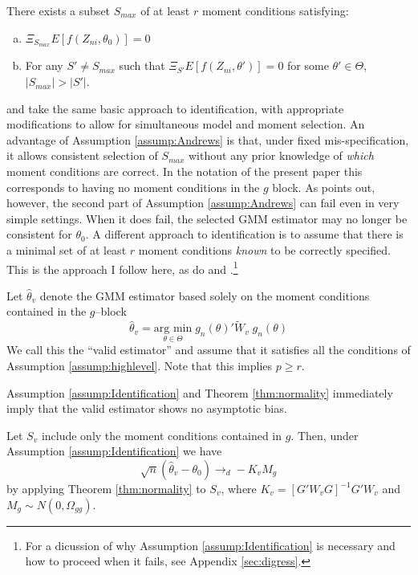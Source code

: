 \begin{assump}
	\label{assump:Andrews}
There exists a subset $S_{max}$ of at least $r$ moment conditions satisfying:
	\begin{enumerate}[(a)]
	 	\item $\Xi_{S_{max}} E[f(Z_{ni},\theta_0)]= 0$
	 	\item For any $S' \neq S_{max}$ such that $\Xi_{S'} E[f(Z_{ni},\theta')]= 0$ for some $\theta' \in \Theta$, $|S_{max}| > |S'|$.
	 \end{enumerate}
\end{assump}

\cite{AndrewsLu} and \cite{HongPrestonShum} take the same basic approach to identification, with appropriate modifications to allow for simultaneous model and moment selection. 
An advantage of Assumption \ref{assump:Andrews} is that, under fixed mis-specification, it allows consistent selection of $S_{max}$ without any prior knowledge of \emph{which} moment conditions are correct. 
In the notation of the present paper this corresponds to having no moment conditions in the $g$ block. As \citet[p.\ 254]{Hallbook} points out, however, the second part of Assumption \ref{assump:Andrews} can fail even in very simple settings.
When it does fail, the selected GMM estimator may no longer be consistent for $\theta_0$. 
A different approach to identification is to assume that there is a minimal set of at least $r$ moment conditions \emph{known} to be correctly specified.
This is the approach I follow here, as do \cite{Liao} and \cite{ChengLiao}.\footnote{For a dicussion of why Assumption \ref{assump:Identification} is necessary and how to proceed when it fails, see Appendix \ref{sec:digress}.}

\begin{assump} 
\label{assump:Identification}
Let $\widehat{\theta}_v$ denote the GMM estimator based solely on the moment conditions contained in the $g$--block
$$\widehat{\theta}_v = \underset{\theta \in \Theta}{\mbox{arg min}}\; g_n(\theta)' \widetilde{W}_{v} \; g_n(\theta)$$
We call this the ``valid estimator'' and assume that it satisfies all the conditions of Assumption \ref{assump:highlevel}. Note that this implies $p\geq r$.
\end{assump}

Assumption \ref{assump:Identification} and Theorem \ref{thm:normality} immediately imply that the valid estimator shows no asymptotic bias. 
\begin{cor}
	\label{cor:valid}
	Let $S_{v}$ include only the moment conditions contained in $g$. 
	Then, under Assumption \ref{assump:Identification} we have
		$$\sqrt{n}\left(\widehat{\theta}_v - \theta_0\right) \rightarrow_d -K_v M_g$$
	by applying Theorem \ref{thm:normality} to $S_{v}$, where $K_v = [G'W_vG]^{-1}G'W_v$ and $M_g \sim N(0,\Omega_{gg})$. 
\end{cor}

